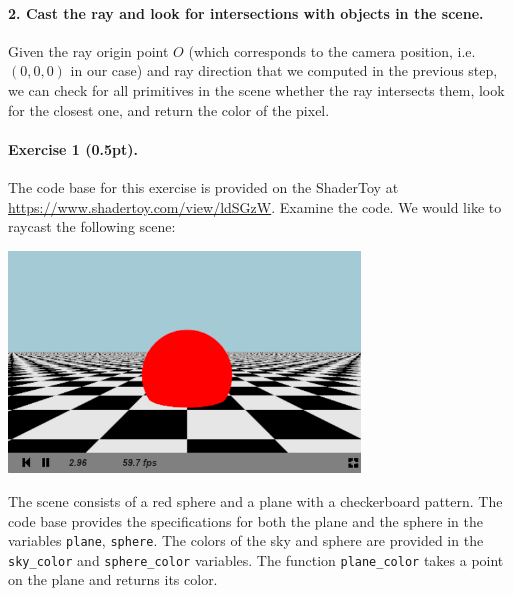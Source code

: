 \documentclass{article}
\newenvironment{exercise}[2]{\paragraph{Exercise #1 (#2pt).} }{
\medskip}
\begin{document}
\paragraph{2. Cast the ray and look for intersections with objects in the scene.} Given the ray origin point $O$ (which corresponds to the camera position, i.e. $(0, 0, 0)$ in our case) and ray direction that we computed in the previous step, we can check for all primitives in the scene whether the ray intersects them, look for the closest one, and return the color of the pixel.

\begin{exercise}{1}{0.5}
The code base for this exercise is provided on the ShaderToy at \url{https://www.shadertoy.com/view/ldSGzW}. Examine the code. We would like to raycast the following scene:
\begin{center}
\includegraphics[width=0.7\textwidth]{raycasting.png}
\end{center}
The scene consists of a red sphere and a plane with a checkerboard pattern. The code base provides the specifications for both the plane and the sphere in the variables \texttt{plane}, \texttt{sphere}. The colors of the sky and sphere are provided in the \verb#sky_color# and \verb#sphere_color# variables. The function \verb#plane_color# takes a point on the plane and returns its color.


\end{exercise}
\end{document}
